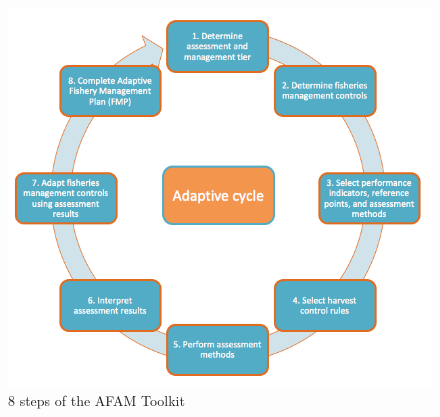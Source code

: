 \documentclass[]{book}
\begin{document}
\begin{figure}
\centering
\includegraphics{myMediaFolder/media/2_image1.png}
\caption{\label{fig:schematic}8 steps of the AFAM Toolkit}
\end{figure}
\end{document}
